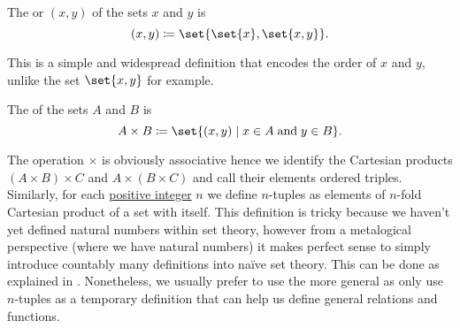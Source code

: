 \begin{definition}\label{def:binary_cartesian_product}
  The  or  \( (x, y) \) of the sets \( x \) and \( y \) is
  \begin{equation*}
    (x, y) \coloneqq \set{ \set{ x }, \set{ x, y } }.
  \end{equation*}

  This is a simple and widespread definition that encodes the order of \( x \) and \( y \), unlike the set \( \set{ x, y } \) for example.

  The  of the sets \( A \) and \( B \) is
  \begin{equation*}
    A \times B \coloneqq \set{ (x, y) \given x \in A \T{and} y \in B }.
  \end{equation*}

  The operation \( \times \) is obviously associative hence we identify the Cartesian products \( (A \times B) \times C \) and \( A \times (B \times C) \) and call their elements ordered triples. Similarly, for each \hyperref[rem:peano_arithmetic_zero/positive]{positive integer} \( n \) we define \( n \)-tuples as elements of \( n \)-fold Cartesian product of a set with itself. This definition is tricky because we haven't yet defined natural numbers within set theory, however from a metalogical perspective (where we have natural numbers) it makes perfect sense to simply introduce countably many definitions into na\"ive set theory. This can be done as explained in . Nonetheless, we usually prefer to use the more general  as only use \( n \)-tuples as a temporary definition that can help us define general relations and functions.
\end{definition}
